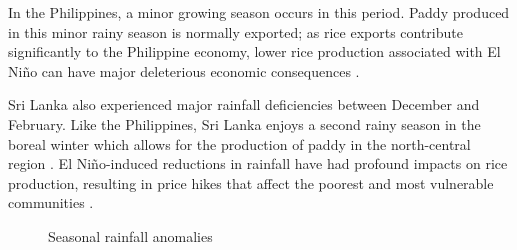 \documentclass[12pt]{article}
\begin{document}
In the Philippines, a minor growing season occurs in this period. Paddy produced in this minor rainy season is normally exported; as rice exports contribute significantly to the Philippine economy, lower rice production associated with El Ni{\~n}o can have major deleterious economic consequences \cite{roberts2009nino}.

Sri Lanka also experienced major rainfall deficiencies between December and February. Like the Philippines, Sri Lanka enjoys a second rainy season in the boreal winter which allows for the production of paddy in the north-central region \cite{zubair2002nino}. El Ni{\~n}o-induced reductions in rainfall have had profound impacts on rice production, resulting in price hikes that affect the poorest and most vulnerable communities \cite{zubair2002nino}. 

\begin{figure}[H]
    \label{fig:seasonal-anomalies}
\centering
  \hfill
  \hfill
  \hfill  
  \hfill
\caption{Seasonal rainfall anomalies}
\end{figure}
\end{document}
